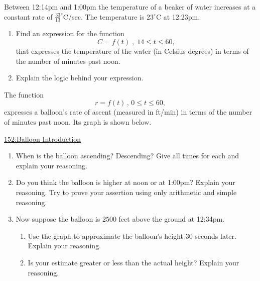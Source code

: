 \documentclass{ximera}
\begin{document}
\begin{example}  \label{Ex:IUDFr3f3fgl}
Between 12:14pm and 1:00pm the temperature of a beaker of water increases at a constant rate of $\frac{33}{13}^\circ$C/sec. The temperature is $23^\circ$C at 12:23pm.

\begin{enumerate}
\item Find an expression for the function 
\[
       C=f(t)\; , \; 14\leq t \leq 60, 
\]
that expresses the temperature of the water (in Celsius degrees) in terms of the number of minutes past noon.

\item Explain the logic behind your expression.

\end{enumerate}
\end{example}



\begin{example}  \label{Ex:98dfrghha}

The function 
\[
    r = f(t) \, , \, 0\leq t \leq  60 , 
\]
expresses a balloon's rate of ascent (measured in ft/min) in terms of the number of minutes past noon. Its graph is shown below.

\begin{onlineOnly}
    \begin{center}
\end{center}
\end{onlineOnly}

\href{https://www.desmos.com/calculator/tgi5yiuzab}{152:Balloon Introduction}

\begin{enumerate}

\item When is the balloon ascending? Descending? Give all times for each and explain your reasoning.

\item Do you think the balloon is higher at noon or at 1:00pm? Explain your reasoning. Try to prove your assertion using only arithmetic and simple reasoning.

\item Now suppose the balloon is $2500$ feet above the ground at 12:34pm. 

\begin{enumerate}

\item Use the graph to approximate the balloon's height $30$ seconds later. Explain your reasoning.

\item Is your estimate greater or less than the actual height? Explain your reasoning.

\end{enumerate}
\end{enumerate}
\end{example}
\end{document}
